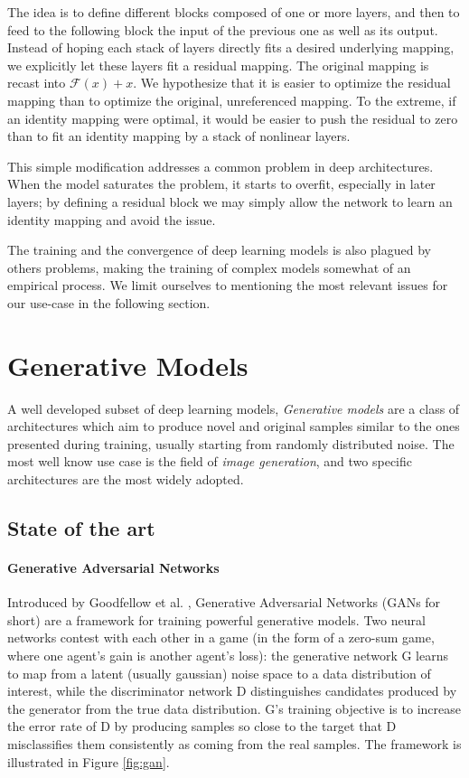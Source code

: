 The idea is to define different blocks composed of one or more layers, and then to feed to the following block the input of the previous one as well as its output. Instead of hoping each stack of layers directly fits a desired underlying mapping, we explicitly let these layers fit a residual mapping. The original mapping is recast into $\mathcal{F}(x) + x$. We hypothesize that it is easier to optimize the residual mapping than to optimize the original, unreferenced mapping. To the extreme, if an identity mapping were optimal, it would be easier to push the residual to zero than to fit an identity mapping by a stack of nonlinear layers. 

This simple modification addresses a common problem in deep architectures. When the model saturates the problem, it starts to overfit, especially in later layers; by defining a residual block we may simply allow the network to learn an identity mapping and avoid the issue.

The training and the convergence of deep learning models is also plagued by others problems, making the training of complex models somewhat of an empirical process. We limit ourselves to mentioning the most relevant issues for our use-case in the following section.

\section{Generative Models} 

A well developed subset of deep learning models, \emph{Generative models} are a class of architectures which aim to produce novel and original samples similar to the ones presented during training, usually starting from randomly distributed noise. The most well know use case is the field of \emph{image generation}, and two specific architectures are the most widely adopted.

\subsection{State of the art}

\paragraph{Generative Adversarial Networks}

Introduced by Goodfellow et al. \cite{gan}, Generative Adversarial Networks (GANs for short) are a framework for training powerful generative models. Two neural networks contest with each other in a game (in the form of a zero-sum game, where one agent's gain is another agent's loss): the generative network G learns to map from a latent (usually gaussian) noise space to a data distribution of interest, while the discriminator network D distinguishes candidates produced by the generator from the true data distribution. G's training objective is to increase the error rate of D by producing samples so close to the target that D misclassifies them consistently as coming from the real samples. The framework is illustrated in Figure \ref{fig:gan}.


